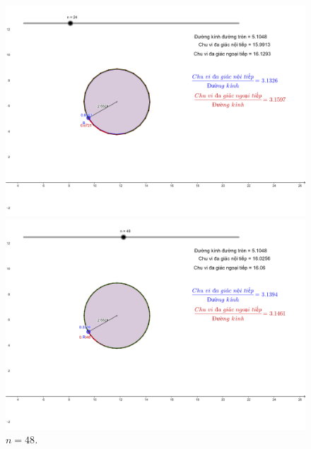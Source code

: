 \begin{multicols}{2}
\begin{figure}[H]
		\caption{\small\textit{\color{lichsutoanhoc}$n = 12$.}}
		\includegraphics[width= 1\linewidth]{14}
		\caption{\small\textit{\color{lichsutoanhoc}$n = 24$.}}
			\includegraphics[width= 1\linewidth]{15}
		\caption{\small\textit{\color{lichsutoanhoc}$n = 48$.}}
		\vspace*{-10pt}
	\end{figure}

\end{multicols}
